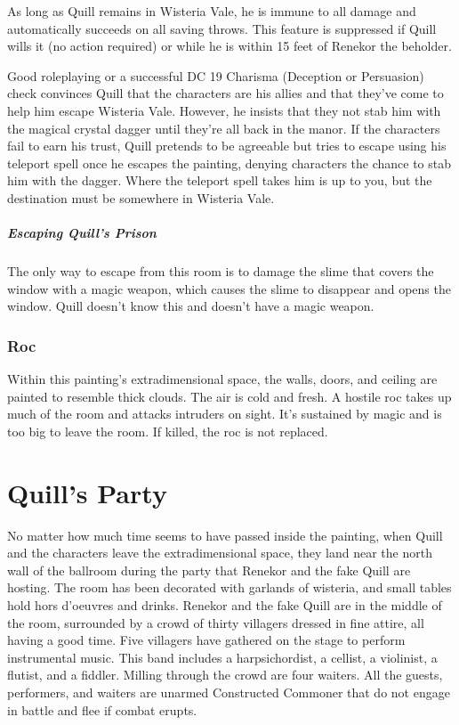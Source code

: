 \documentclass[10pt,a4paper,twoside,bg=print,twocolumn,openany,nodeprecatedcode]{dndbook}
\begin{document}
As long as Quill remains in Wisteria Vale, he is immune to all damage and automatically succeeds on all saving throws. This feature is suppressed if Quill wills it (no action required) or while he is within 15 feet of Renekor the beholder.

Good roleplaying or a successful DC 19 Charisma (Deception or Persuasion) check convinces Quill that the characters are his allies and that they've come to help him escape Wisteria Vale. However, he insists that they not stab him with the magical crystal dagger until they're all back in the manor. If the characters fail to earn his trust, Quill pretends to be agreeable but tries to escape using his teleport spell once he escapes the painting, denying characters the chance to stab him with the dagger. Where the teleport spell takes him is up to you, but the destination must be somewhere in Wisteria Vale.

\subparagraph{Escaping Quill's Prison}
The only way to escape from this room is to damage the slime that covers the window with a magic weapon, which causes the slime to disappear and opens the window. Quill doesn't know this and doesn't have a magic weapon.

\subsubsection{Roc}
Within this painting's extradimensional space, the walls, doors, and ceiling are painted to resemble thick clouds. The air is cold and fresh. A hostile roc takes up much of the room and attacks intruders on sight. It's sustained by magic and is too big to leave the room. If killed, the roc is not replaced.

\section{Quill's Party}
No matter how much time seems to have passed inside the painting, when Quill and the characters leave the extradimensional space, they land near the north wall of the ballroom during the party that Renekor and the fake Quill are hosting. The room has been decorated with garlands of wisteria, and small tables hold hors d'oeuvres and drinks. Renekor and the fake Quill are in the middle of the room, surrounded by a crowd of thirty villagers dressed in fine attire, all having a good time. Five villagers have gathered on the stage to perform instrumental music. This band includes a harpsichordist, a cellist, a violinist, a flutist, and a fiddler. Milling through the crowd are four waiters. All the guests, performers, and waiters are unarmed Constructed Commoner that do not engage in battle and flee if combat erupts.
\end{document}
